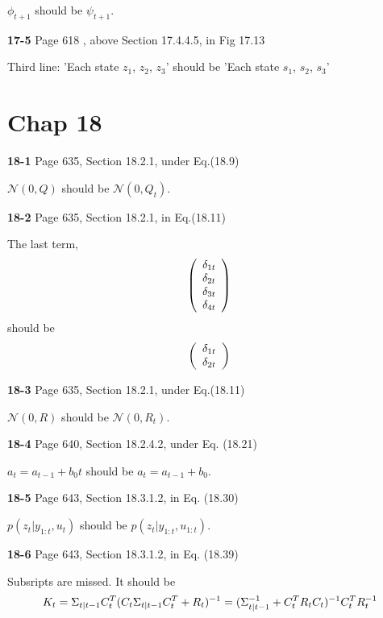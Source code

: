 \documentclass[aps,preprint,a4]{revtex4-1}
\newcommand{\nl}{\nonumber \\}
\begin{document}
$\phi_{t+1}$ should be $\psi_{t+1}$.

{\color{red}\textbf{17-5}} Page 618 , above Section 17.4.4.5, in Fig 17.13

Third line: 'Each state $z_{1}$, $z_{2}$, $z_{3}$' should be 'Each state $s_{1}$, $s_{2}$, $s_{3}$'


\section{Chap 18}
{\color{red}\textbf{18-1}} Page 635, Section 18.2.1, under Eq.(18.9)

$\mathcal N(0,Q)$ should be $\mathcal N(0,Q_{t})$.

{\color{red}\textbf{18-2}} Page 635, Section 18.2.1, in Eq.(18.11)

The last term,
\begin{equation}
\left(\begin{array}{c}\delta_{1t} \\ \delta_{2t} \\ \delta_{3t} \\ \delta_{4t}\end{array}\right)\nl
\end{equation}
should be
\begin{equation}
\left(\begin{array}{c}\delta_{1t} \\ \delta_{2t} \end{array}\right)\nl
\end{equation}

{\color{red}\textbf{18-3}} Page 635, Section 18.2.1, under Eq.(18.11)

$\mathcal N(0,R)$ should be $\mathcal N(0,R_{t})$.

{\color{red}\textbf{18-4}} Page 640, Section 18.2.4.2, under Eq. (18.21)

$a_{t}=a_{t-1}+b_{0}t$ should be $a_{t}=a_{t-1}+b_{0}$.

{\color{red}\textbf{18-5}} Page 643, Section 18.3.1.2, in Eq. (18.30)

$p(z_{t}|y_{1:t},u_{t})$ should be $p(z_{t}|y_{1:t},u_{1:t})$.

{\color{red}\textbf{18-6}} Page 643, Section 18.3.1.2, in Eq. (18.39)

Subsripts are missed. It should be
\begin{equation}
K_{t} = \Sigma_{t|t-1}C^{T}_{t}(C_{t}\Sigma_{t|t-1}C^{T}_{t}+R_{t})^{-1}
=(\Sigma_{t|t-1}^{-1} + C^{T}_{t}R_{t}C_{t})^{-1}C^{T}_{t}R^{-1}_{t}\nl
\end{equation}
\end{document}
